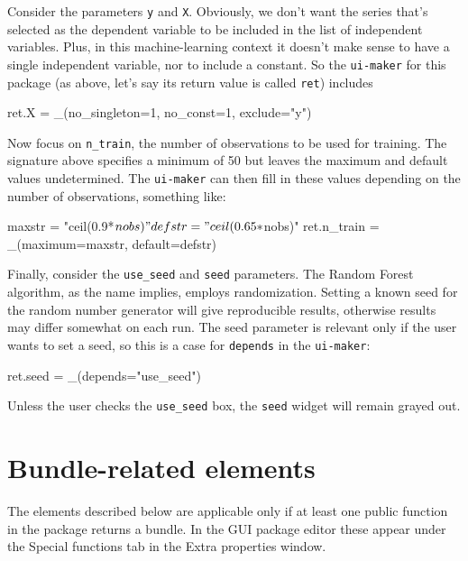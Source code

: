 \documentclass[oneside]{book}
\begin{document}
Consider the parameters \texttt{y} and \texttt{X}. Obviously, we don't
want the series that's selected as the dependent variable to be
included in the list of independent variables. Plus, in this
machine-learning context it doesn't make sense to have a single
independent variable, nor to include a constant. So the
\texttt{ui-maker} for this package (as above, let's say its return
value is called \texttt{ret}) includes
\begin{code}
ret.X = _(no_singleton=1, no_const=1, exclude="y")
\end{code}

Now focus on \texttt{n\_train}, the number of observations to be used
for training. The signature above specifies a minimum of 50 but leaves
the maximum and default values undetermined. The \texttt{ui-maker} can
then fill in these values depending on the number of observations,
something like:
\begin{code}
maxstr = "ceil(0.9*$nobs)"
defstr = "ceil(0.65*$nobs)"
ret.n_train = _(maximum=maxstr, default=defstr)
\end{code}

Finally, consider the \texttt{use\_seed} and \texttt{seed}
parameters. The Random Forest algorithm, as the name implies, employs
randomization. Setting a known seed for the random number generator
will give reproducible results, otherwise results may differ somewhat
on each run. The seed parameter is relevant only if the user wants to
set a seed, so this is a case for \texttt{depends} in the
\texttt{ui-maker}:
\begin{code}
ret.seed = _(depends="use_seed")
\end{code}
Unless the user checks the \texttt{use\_seed} box, the \texttt{seed}
widget will remain grayed out.

\section{Bundle-related elements}
\label{sec:spec-bundle}

The elements described below are applicable only if at least one
public function in the package returns a bundle. In the GUI package
editor these appear under the \textsf{Special functions} tab in the
\textsf{Extra properties} window.
\end{document}
